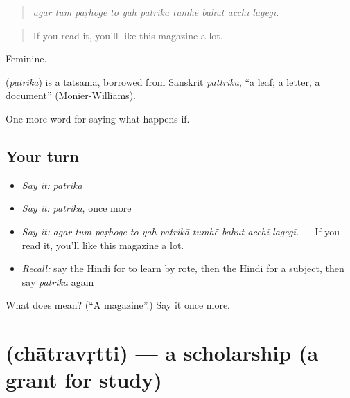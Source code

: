 \begin{quote}
         
\end{quote}

\begin{quote}
\emph{agar tum paṛhoge to yah patrikā tumhẽ bahut acchī lagegī.}
\end{quote}

\begin{quote}
If you read it, you'll like this magazine a lot.
\end{quote}

Feminine.

\begin{cousinweb}
\textbf{} (\emph{patrikā}) is a tatsama, borrowed from Sanskrit \emph{pattrikā}, \textquotedblleft{}a leaf; a letter, a document\textquotedblright{} (Monier-Williams).
\end{cousinweb}

\begin{grammarlens}[title={What you've built}]
One more word for saying what happens if.
\end{grammarlens}

\subsection*{Your turn}
\begin{itemize}
\raggedright
  \item \emph{Say it:} \emph{patrikā}
  \item \emph{Say it:} \emph{patrikā}, once more
  \item \emph{Say it:} \emph{agar tum paṛhoge to yah patrikā tumhẽ bahut acchī lagegī.} — If you read it, you'll like this magazine a lot.
  \item \emph{Recall:} say the Hindi for to learn by rote, then the Hindi for a subject, then say \emph{patrikā} again
\end{itemize}

\begin{tcolorbox}[breakable,colback=teal!4,colframe=teal!35!black,title={Before you move on}]
What does  mean? (\textquotedblleft{}A magazine\textquotedblright{}.) Say it once more.
\end{tcolorbox}
\section[\texorpdfstring{\hi{छात्रवृत्ति} (chātravṛtti)}{छात्रवृत्ति (chātravṛtti)}]{ (chātravṛtti) — a scholarship (a grant for study)}


